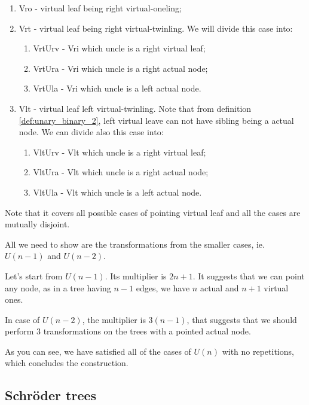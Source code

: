 \documentclass[final]{article}
\theoremstyle{definition}
\theoremstyle{remark}
\begin{document}
\begin{enumerate}
    \item Vro - virtual leaf being right virtual-oneling;
    \item Vrt - virtual leaf being right virtual-twinling. We will divide this case into:
        \begin{enumerate}
            \item VrtUrv - Vri which uncle is a right virtual leaf;
            \item VrtUra - Vri which uncle is a right actual node;
            \item VrtUla - Vri which uncle is a left actual node.
        \end{enumerate}
    \item Vlt - virtual leaf left virtual-twinling. Note that from definition \ref{def:unary_binary_2}, left virtual leave can not have sibling being a actual node. We can divide also this case into:
        \begin{enumerate}
            \item VltUrv - Vlt which uncle is a right virtual leaf;
            \item VltUra - Vlt which uncle is a right actual node;
            \item VltUla - Vlt which uncle is a left actual node.
        \end{enumerate}
\end{enumerate}

Note that it covers all possible cases of pointing virtual leaf and all the cases are mutually disjoint.

All we need to show are the transformations from the smaller cases, ie. \(U(n-1)\) and \(U(n-2)\).

Let's start from \(U(n-1)\). Its multiplier is \(2n + 1\). It suggests that we can point any node, as in a tree having \(n - 1\) edges, we have \(n\) actual and \(n + 1\) virtual ones.

In case of \(U(n-2)\), the multiplier is \(3(n-1)\), that suggests that we should perform \(3\) transformations on the trees with a pointed actual node.


As you can see, we have satisfied all of the cases of \(U(n)\) with no repetitions, which concludes the construction.

\subsection{Schröder trees}%
\label{sub:schröder_trees}
\end{document}
